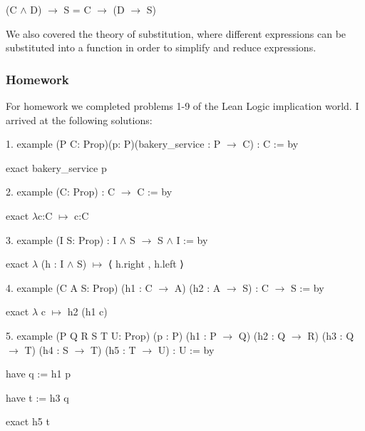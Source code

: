 \documentclass{article}
\theoremstyle{theorem}
\theoremstyle{definition}
\theoremstyle{remark}
\begin{document}
\hspace{7cm}(C $\wedge$ D) $\rightarrow$ S = C $\rightarrow$ (D $\rightarrow$ S)

\hspace{0.65cm}We also covered the theory of substitution, where different expressions can be substituted into a function in order to simplify and reduce expressions.

\subsubsection{Homework}
For homework we completed problems 1-9 of the Lean Logic implication world. I arrived at the following solutions:
\begin{list}{}{A Lean Intro to Logic:}
  \item{1.} example (P C: Prop)(p: P)(bakery\_service : P $\rightarrow$ C) : C := by 
      
  \hspace{6cm}exact bakery\_service p 

  \item {2.} example (C: Prop) : C $\rightarrow$ C := by
  
\hspace{6cm}exact $\lambda$c:C $\mapsto$ c:C

  \item {3.} example (I S: Prop) : I $\wedge$ S $\rightarrow$ S $\wedge$ I := by

\hspace{6cm}exact $\lambda$ (h : I $\wedge$ S) $\mapsto$ ⟨ h.right , h.left ⟩ 
 
  \item {4.} example (C A S: Prop) (h1 : C $\rightarrow$ A) (h2 : A $\rightarrow$ S) : C $\rightarrow$ S := by
 
  \hspace{6cm} exact $\lambda$ c $\mapsto$ h2 (h1 c)
 
  \item {5.} example (P Q R S T U: Prop) (p : P) (h1 : P $\rightarrow$ Q) (h2 : Q $\rightarrow$ R) (h3 : Q $\rightarrow$ T) (h4 : S $\rightarrow$ T) (h5 : T $\rightarrow$ U) : U := by
  
  \hspace{6cm} have q := h1 p     

  \hspace{6cm} have t := h3 q  

  \hspace{6cm} exact h5 t     

\end{list}
\end{document}
